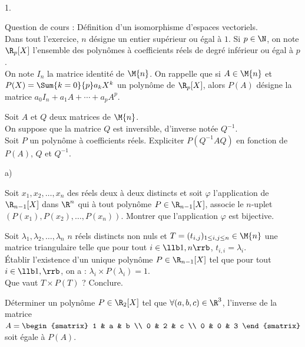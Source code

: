 \documentclass[11pt]{article}%
\begin{document}
\begin{exerciceAP}~
  \begin{noliste}{1.}
    \setlength{\itemsep}{2mm}
  \item Question de cours : Définition d'un isomorphisme d'espaces vectoriels.\\
    Dans tout l'exercice, $n$ désigne un entier supérieur ou égal à
    $1$. Si $p\in\N$, on note $\R_p[X]$ l'ensemble des polynômes à
    coefficients réels de degré inférieur ou égal à $p$.\\
    On note $I_n$ la matrice identité de $\M{n}$. On rappelle que si
    $A\in\M{n}$ et $P(X) = \Sum{k=0}{p} a_kX^k$ un polynôme de
    $\R_p[X]$, alors $P(A)$ désigne la matrice $a_0 I_n+a_1 A+\cdots +
    a_p A^p$.

  \item Soit $A$ et $Q$ deux matrices de $\M{n}$.\\
    On suppose que la matrice $Q$ est inversible, d'inverse notée
    $Q^{-1}$.\\
    Soit $P$ un polynôme à coefficients réels. Expliciter
    $P(Q^{-1}AQ)$ en fonction de $P(A)$, $Q$ et $Q^{-1}$.

  \item 
    \begin{noliste}{a)}
    \setlength{\itemsep}{2mm}
    \item Soit $x_1,x_2,\hdots,x_n$ des réels deux à deux distincts et
      soit $\varphi$ l'application de $\R_{n-1}[X]$ dans $\R^n$ qui à
      tout polynôme $P\in\R_{n-1}[X]$, associe le $n$-uplet
      $\left(P(x_1), P(x_2), \hdots, P(x_n)\right)$. Montrer que
      l'application $\varphi$ est bijective.

    \item Soit $\lambda_1,\lambda_2,\hdots,\lambda_n$ $n$ réels
      distincts non nuls et $T=(t_{i,j})_{1\leq i,j\leq n}\in\M{n}$
      une matrice triangulaire telle que pour tout $i\in\llb 1,n\rrb$,
      $t_{i,i}=\lambda_i$.\\
      Établir l'existence d'un unique polynôme $P\in\R_{n-1}[X]$ tel
      que pour tout $i\in\llb 1,\rrb$, on a : $\lambda_i \times
      P(\lambda_i) = 1$.\\
      Que vaut $T \times P(T)$ ? Conclure.
    \end{noliste}
  \item Déterminer un polynôme $P\in\R_2[X]$ tel que $\forall
    (a,b,c)\in\R^3$, l'inverse de la matrice $A =
    \begin{smatrix}
      1 & a & b \\ 
      0 & 2 & c \\ 
      0 & 0 & 3
    \end{smatrix}$ soit égale à $P(A)$.
  \end{noliste}
\end{exerciceAP}
\end{document}
